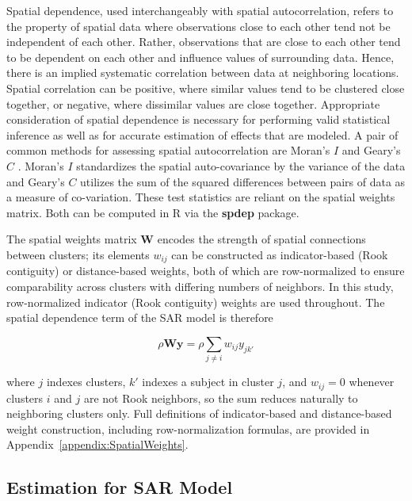 \documentclass{article}[11pt]
\begin{document}
Spatial dependence, used interchangeably with spatial autocorrelation, refers to the property of spatial data where observations close to each other tend not be independent of each other. Rather, observations that are close to each other tend to be dependent on each other and influence values of surrounding data. Hence, there is an implied systematic correlation between data at neighboring locations. Spatial correlation can be positive, where similar values tend to be clustered close together, or negative, where dissimilar values are close together. Appropriate consideration of spatial dependence is necessary for performing valid statistical inference as well as for accurate estimation of effects that are modeled. A pair of common methods for assessing spatial autocorrelation are Moran's $\textit{I}$ \cite{moran_interpretation_1948}\cite{moran_notes_1950} and Geary's $\textit{C}$ \cite{geary_contiguity_1954}\cite{waller_applied_2004}. Moran's $\textit{I}$ standardizes the spatial auto-covariance by the variance of the data and Geary's $\textit{C}$ utilizes the sum of the squared differences between pairs of data as a measure of co-variation. These test statistics are reliant on the spatial weights matrix. Both can be computed in R via the \textbf{spdep} package\cite{bivand_comparing_2018}.


The spatial weights matrix $\mathbf{W}$ encodes the strength of spatial connections between clusters; its elements $w_{ij}$ can be constructed as indicator-based (Rook contiguity) or distance-based weights, both of which are row-normalized to ensure comparability across clusters with differing numbers of neighbors. In this study, row-normalized indicator (Rook contiguity) weights are used throughout. The spatial dependence term of the SAR model is therefore

\begin{equation}\label{Equation:SpatialDepTerm}
    \rho\mathbf{Wy} = \rho\sum_{j \neq i}w_{ij}y_{jk'}
\end{equation}

where $j$ indexes clusters, $k'$ indexes a subject in cluster $j$, and $w_{ij} = 0$ whenever clusters $i$ and $j$ are not Rook neighbors, so the sum reduces naturally to neighboring clusters only. Full definitions of indicator-based and distance-based weight construction, including row-normalization formulas, are provided in Appendix~\ref{appendix:SpatialWeights}.

\subsection{Estimation for SAR Model}
\end{document}

